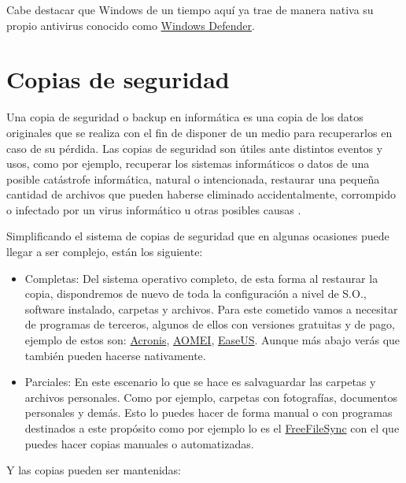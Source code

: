 \documentclass[
  spanish,
  a4paper,
  openany]{book}
\begin{document}
Cabe destacar que Windows de un tiempo aquí ya trae de manera nativa su propio antivirus conocido como \href{https://www.microsoft.com/es-es/windows/comprehensive-security}{Windows Defender}.

\hypertarget{copias-de-seguridad}{%
\section{Copias de seguridad}\label{copias-de-seguridad}}

Una copia de seguridad o backup en informática es una copia de los datos originales que se realiza con el fin de disponer de un medio para recuperarlos en caso de su pérdida. Las copias de seguridad son útiles ante distintos eventos y usos, como por ejemplo, recuperar los sistemas informáticos o datos de una posible catástrofe informática, natural o intencionada, restaurar una pequeña cantidad de archivos que pueden haberse eliminado accidentalmente, corrompido o infectado por un virus informático u otras posibles causas \citep{WIKI-copias-seguridad}.

Simplificando el sistema de copias de seguridad que en algunas ocasiones puede llegar a ser complejo, están los siguiente:

\begin{itemize}
\item
  Completas: Del sistema operativo completo, de esta forma al restaurar la copia, dispondremos de nuevo de toda la configuración a nivel de S.O., software instalado, carpetas y archivos. Para este cometido vamos a necesitar de programas de terceros, algunos de ellos con versiones gratuitas y de pago, ejemplo de estos son: \href{https://www.acronis.com/}{Acronis}, \href{https://www.aomeitech.com/}{AOMEI}, \href{https://www.easeus.com/}{EaseUS}. Aunque más abajo verás que también pueden hacerse nativamente.
\item
  Parciales: En este escenario lo que se hace es salvaguardar las carpetas y archivos personales. Como por ejemplo, carpetas con fotografías, documentos personales y demás. Esto lo puedes hacer de forma manual o con programas destinados a este propósito como por ejemplo lo es el \href{https://freefilesync.org/}{FreeFileSync} con el que puedes hacer copias manuales o automatizadas.
\end{itemize}

Y las copias pueden ser mantenidas:
\end{document}
